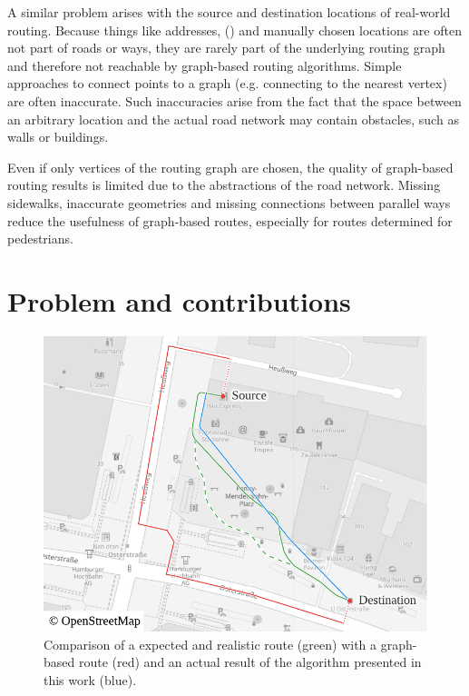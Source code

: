 	A similar problem arises with the source and destination locations of real-world routing.
	Because things like addresses,  () and manually chosen locations are often not part of roads or ways, they are rarely part of the underlying routing graph and therefore not reachable by graph-based routing algorithms.
	Simple approaches to connect points to a graph (e.g. connecting to the nearest vertex) are often inaccurate.
	Such inaccuracies arise from the fact that the space between an arbitrary location and the actual road network may contain obstacles, such as walls or buildings.
	
	Even if only vertices of the routing graph are chosen, the quality of graph-based routing results is limited due to the abstractions of the road network.
	Missing sidewalks, inaccurate geometries and missing connections between parallel ways reduce the usefulness of graph-based routes, especially for routes determined for pedestrians.
	
\section{Problem and contributions}
	
	\begin{figure}
		\begin{figcenter}
			\includegraphics[width=\linewidth]{images/qgis-routing-osterstrasse}
		\end{figcenter}
		\caption[Comparison of normal routing with hybrid visibility routing.]{Comparison of a expected and realistic route (green) with a graph-based route (red) and an actual result of the algorithm presented in this work (blue).}
		\label{fig:osterstrasse-routing-vs-expected}
	\end{figure}


